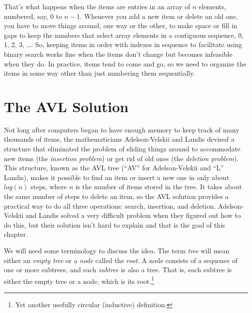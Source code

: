 That's what happens when the items are entries in
an array of $n$ elements,
numbered, say, 0 to $n - 1$.
Whenever you add a new item or delete an old one,
you have to move things around, one way or the other,
to make space or fill in gaps to
keep the numbers that select array elements
in a contiguous sequence, 0, 1, 2, 3, \dots.
So, keeping items in order with indexes in sequence
to facilitate using binary search
works fine when the items don't change
but becomes infeasible when they do.
In practice, items tend to come and go,
so we need to organize the items in some way
other than just numbering them sequentially.

\section{The AVL Solution}

Not long after computers began to have enough
memory to keep track of many thousands of items,
the mathematicians Adelson-Velskii
and Landis
devised a structure that
eliminated the problem of sliding things around to
accommodate new items (the \emph{insertion problem})
or get rid of old ones (the \emph{deletion problem}).
This structure, known as the
AVL tree
(``AV'' for Adelson-Velskii and ``L'' Landis)\label{AVL-tree},
makes it possible to find an item or
insert a new one
in only about $log(n)$ steps, where $n$ is the number
of items stored in the tree.
It takes about the same number of steps to delete an item,
so the AVL solution provides a practical way to do all three
operations: search, insertion, and deletion.
Adelson-Velskii and Landis solved a very difficult problem
when they figured out how to do this,
but their solution isn't hard to explain
and that is the goal of this chapter.

We will need some terminology to discuss the idea.
\label{empty-tree-def}The term \emph{tree}
will mean either an \emph{empty tree}
or a \label{node-def}\emph{node} called the
\label{root-def}\emph{root}.
A node consists of a sequence of one or more subtrees, and each
\label{subtree-def}\emph{subtree}
is also a tree.
That is, each subtree is either the empty tree
or a node, which is its root.\footnote{Yet
another usefully circular (inductive) definition.}

